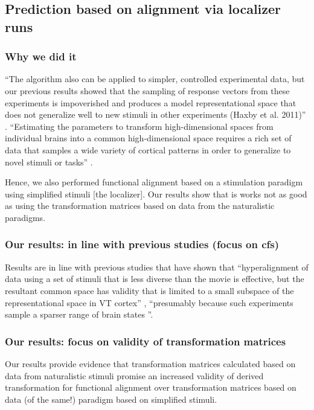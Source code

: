 \subsection{Prediction based on alignment via localizer runs}

\subsubsection{Why we did it}

%
``The algorithm also can be applied to simpler, controlled experimental data,
but our previous results showed that the sampling of response vectors from these
experiments is impoverished and produces a model representational space that
does not generalize well to new stimuli in other experiments (Haxby et al.
2011)'' \citep{guntupalli2016model}.
%
``Estimating the parameters to transform high-dimensional spaces from individual
brains into a common high-dimensional space requires a rich set of data that
samples a wide variety of cortical patterns in order to generalize to novel
stimuli or tasks'' \citep{haxby2020hyperalignment}.

%
Hence, we also performed functional alignment based on a stimulation paradigm
using simplified stimuli [the localizer].
%
Our results show that is works not as good as using the transformation matrices
based on data from the naturalistic paradigms.


\subsubsection{Our results: in line with previous studies (focus on \ac{cfs})}
%
Results are in line with previous studies \citep{haxby2011common,
guntupalli2016model} that have shown that ``hyperalignment of data using a set
of stimuli that is less diverse than the movie is effective, but the resultant
common space has validity that is limited to a small subspace of the
representational space in VT cortex'' \citep{haxby2011common}, ``presumably
because such experiments sample a sparser range of brain states
\citep{guntupalli2016model}''.


\subsubsection{Our results: focus on validity of transformation matrices}

%
Our results provide evidence that transformation matrices calculated based
on data from naturalistic stimuli promise an increased validity of derived
transformation for functional alignment over transformation matrices based on
data (of the same!) paradigm based on simplified stimuli.

